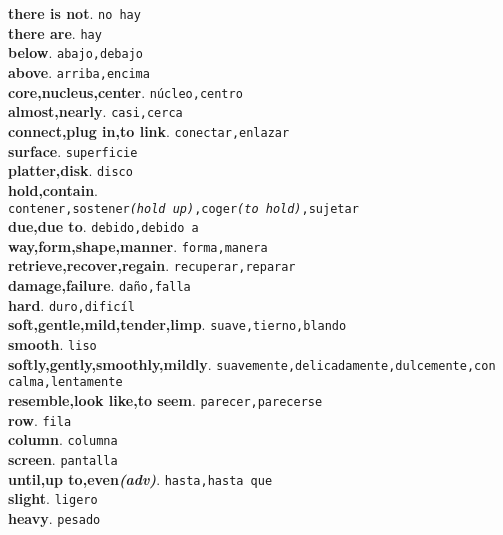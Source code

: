 \documentclass[twocolumn]{article}
\begin{document}
	\textsf{\textbf{there is not}}. \texttt{no hay}\\
	\textsf{\textbf{there are}}. \texttt{hay}\\
	\textsf{\textbf{below}}. \texttt{abajo,debajo}\\
	\textsf{\textbf{above}}. \texttt{arriba,encima}\\
	\textsf{\textbf{core,nucleus,center}}. \texttt{n\'ucleo,centro}\\
	\textsf{\textbf{almost,nearly}}. \texttt{casi,cerca}\\
	\textsf{\textbf{connect,plug in,to link}}. \texttt{conectar,enlazar}\\
	\textsf{\textbf{surface}}. \texttt{superficie}\\
	\textsf{\textbf{platter,disk}}. \texttt{disco}\\
	\textsf{\textbf{hold,contain}}.\\\texttt{contener,sostener{\scriptsize \textsl{(hold up)}},coger{\scriptsize \textsl{(to hold)}},sujetar}\\
	\textsf{\textbf{due,due to}}. \texttt{debido,debido a}\\
	\textsf{\textbf{way,form,shape,manner}}. \texttt{forma,manera}\\
	\textsf{\textbf{retrieve,recover,regain}}. \texttt{recuperar,reparar}\\
	\textsf{\textbf{damage,failure}}. \texttt{da\~no,falla}\\
	\textsf{\textbf{hard}}. \texttt{duro,dific\'il}\\
	\textsf{\textbf{soft,gentle,mild,tender,limp}}. \texttt{suave,tierno,blando}\\
	\textsf{\textbf{smooth}}. \texttt{liso}\\
	\textsf{\textbf{softly,gently,smoothly,mildly}}. \texttt{suavemente,delicadamente,dulcemente,con calma,lentamente}\\
	\textsf{\textbf{resemble,look like,to seem}}. \texttt{parecer,parecerse}\\
	\textsf{\textbf{row}}. \texttt{fila}\\
	\textsf{\textbf{column}}. \texttt{columna}\\
	\textsf{\textbf{screen}}. \texttt{pantalla}\\
	\textsf{\textbf{until,up to,even{\scriptsize \textsl{(adv)}}}}. \texttt{hasta,hasta que}\\
	\textsf{\textbf{slight}}. \texttt{ligero}\\
	\textsf{\textbf{heavy}}. \texttt{pesado}\\
\end{document}
